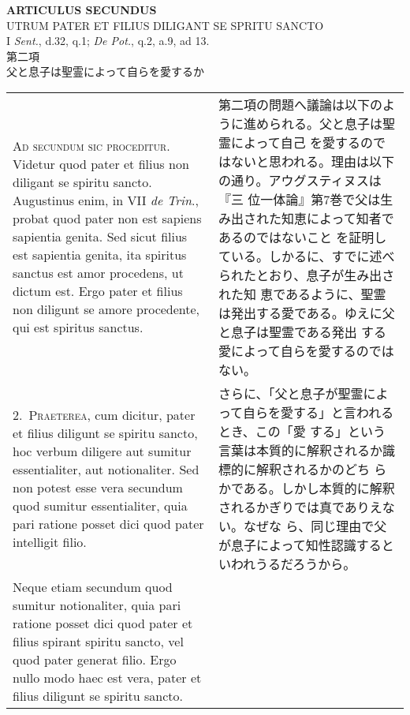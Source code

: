 \documentclass[10pt]{jsarticle} %
\begin{document}
\begin{center}
{\Large {\bf ARTICULUS SECUNDUS}}\\
{\large UTRUM PATER ET FILIUS DILIGANT SE SPRITU SANCTO}\\
{\footnotesize I {\itshape Sent.}, d.32, q.1; {\itshape De Pot.}, q.2, a.9, ad 13.}\\
{\Large 第二項\\父と息子は聖霊によって自らを愛するか}
\end{center}

\begin{longtable}{p{21em}p{21em}}


{\scshape Ad secundum sic proceditur}. Videtur quod pater et filius
 non diligant se spiritu sancto. Augustinus enim, in VII {\itshape de
 Trin}., probat quod pater non est sapiens sapientia genita. Sed sicut
 filius est sapientia genita, ita spiritus sanctus est amor procedens,
 ut dictum est. Ergo pater et filius non diligunt se amore procedente,
 qui est spiritus sanctus.


&

第二項の問題へ議論は以下のように進められる。父と息子は聖霊によって自己
を愛するのではないと思われる。理由は以下の通り。アウグスティヌスは『三
位一体論』第7巻で父は生み出された知恵によって知者であるのではないこと
を証明している。しかるに、すでに述べられたとおり、息子が生み出された知
恵であるように、聖霊は発出する愛である。ゆえに父と息子は聖霊である発出
する愛によって自らを愛するのではない。

\\


2.~{\scshape Praeterea}, cum dicitur, pater et filius diligunt se
 spiritu sancto, hoc verbum diligere aut sumitur essentialiter, aut
 notionaliter. Sed non potest esse vera secundum quod sumitur
 essentialiter, quia pari ratione posset dici quod pater intelligit
 filio. 

&

さらに、「父と息子が聖霊によって自らを愛する」と言われるとき、この「愛
 する」という言葉は本質的に解釈されるか識標的に解釈されるかのどち
 らかである。しかし本質的に解釈されるかぎりでは真でありえない。なぜな
 ら、同じ理由で父が息子によって知性認識するといわれうるだろうから。

\\


Neque etiam secundum quod sumitur notionaliter, quia pari
 ratione posset dici quod pater et filius spirant spiritu sancto, vel
 quod pater generat filio. Ergo nullo modo haec est vera, pater et
 filius diligunt se spiritu sancto.



\end{longtable}
\end{document}
